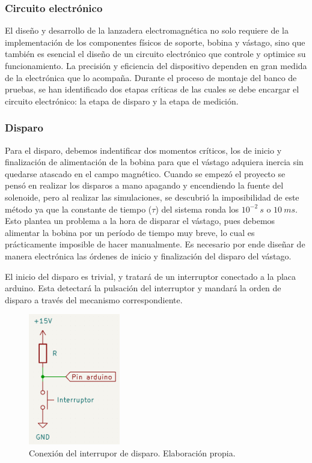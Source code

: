 \subsubsection{Circuito electrónico}
\label{subsub:circuito}
El diseño y desarrollo de la lanzadera electromagnética no solo requiere de la implementación de los componentes físicos de soporte, bobina y vástago, sino que también es esencial el diseño de un circuito electrónico que controle y optimice su funcionamiento. La precisión y eficiencia del dispositivo dependen en gran medida de la electrónica que lo acompaña. Durante el proceso de montaje del banco de pruebas, se han identificado dos etapas críticas de las cuales se debe encargar el circuito electrónico: la etapa de disparo y la etapa de medición.

\subsubsection*{Disparo}

Para el disparo, debemos indentificar dos momentos críticos, los de inicio y finalización de alimentación de la bobina para que el vástago adquiera inercia sin quedarse atascado en el campo magnético. Cuando se empezó el proyecto se pensó en realizar los disparos a mano apagando y encendiendo la fuente del solenoide, pero al realizar las simulaciones, se descubrió la imposibilidad de este método ya que la constante de tiempo (\(\tau\)) del sistema ronda los \(10^{-2}~s\) o \(10~ms\). Esto plantea un problema a la hora de disparar el vástago, pues debemos alimentar la bobina por un período de tiempo muy breve, lo cual es prácticamente imposible de hacer manualmente. Es necesario por ende diseñar de manera electrónica las órdenes de inicio y finalización del disparo del vástago.

El inicio del disparo es trivial, y tratará de un interruptor conectado a la placa arduino. Esta detectará la pulsación del interruptor y mandará la orden de disparo a través del mecanismo correspondiente.

\begin{figure}[H]
    \centering
    \includegraphics[width=4cm]{FigurasMemoria/conexionInterruptor.png}
    \caption{Conexión del interrupor de disparo. Elaboración propia.}
    \label{fig:conexionInterruptor} %
\end{figure}


